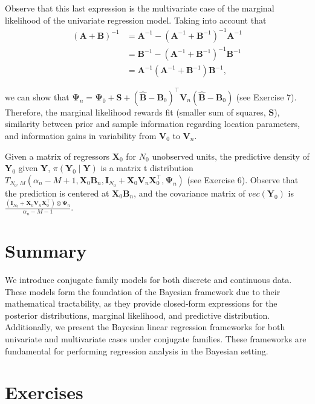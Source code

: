 Observe that this last expression is the multivariate case of the marginal likelihood of the univariate regression model. Taking into account that 
\begin{align*}
	({\bm{A}}+{\bm{B}})^{-1}&={\bm{A}}^{-1}-({\bm{A}}^{-1}+{\bm{B}}^{-1})^{-1}{\bm{A}}^{-1}\\
	&={\bm{B}}^{-1}-({\bm{A}}^{-1}+{\bm{B}}^{-1})^{-1}{\bm{B}}^{-1}\\
	&={\bm{A}}^{-1}({\bm{A}}^{-1}+{\bm{B}}^{-1}){\bm{B}}^{-1},
\end{align*} 

we can show that ${\bm{\Psi}}_{n}={\bm{\Psi}}_{0}+{\bm{S}}+(\hat{\bm{B}}-{\bm{B}}_{0})^{\top}{\bm{V}}_{n}(\hat{\bm{B}}-{\bm{B}}_{0})$ (see Exercise 7). Therefore, the marginal likelihood rewards fit (smaller sum of squares, ${\bm{S}}$), similarity between prior and sample information regarding location parameters, and information gains in variability from ${\bm{V}}_0$ to ${\bm{V}}_n$.   

Given a matrix of regressors ${\bm{X}}_0$ for $N_0$ unobserved units, the predictive density of ${\bm{Y}}_0$ given ${\bm{Y}}$, $\pi({\bm{Y}}_0\mid {\bm{Y}})$ is a matrix t distribution $T_{N_0,M}(\alpha_n-M+1,{\bm{X}}_0{\bm{B}}_n,{\bm{I}}_{N_0}+{\bm{X}}_0{\bm{V}}_n{\bm{X}}_0^{\top},{\bm{\Psi}}_n)$ (see Exercise 6). Observe that the prediction is centered at ${\bm{X}}_0{\bm{B}}_n$, and the covariance matrix of $vec({\bm{Y}}_0)$ is $\frac{({\bm{I}}_{N_0}+{\bm{X}}_0{\bm{V}}_n{\bm{X}}_0^{\top})\otimes{\bm{\Psi}}_n}{\alpha_n-M-1}$.  

\section{Summary}\label{sec45}
We introduce conjugate family models for both discrete and continuous data. These models form the foundation of the Bayesian framework due to their mathematical tractability, as they provide closed-form expressions for the posterior distributions, marginal likelihood, and predictive distribution. Additionally, we present the Bayesian linear regression frameworks for both univariate and multivariate cases under conjugate families. These frameworks are fundamental for performing regression analysis in the Bayesian setting.

\section{Exercises}\label{sec46}

